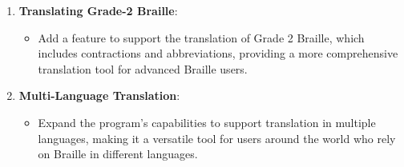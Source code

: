 \begin{enumerate}
    \item \textbf{Translating Grade-2 Braille}:
    \begin{itemize}
        \item Add a feature to support the translation of Grade 2 Braille, which includes contractions and abbreviations, providing a more comprehensive translation tool for advanced Braille users.
    \end{itemize}
    
    \item \textbf{Multi-Language Translation}:
    \begin{itemize}
        \item Expand the program's capabilities to support translation in multiple languages, making it a versatile tool for users around the world who rely on Braille in different languages.
    \end{itemize}
    
\end{enumerate}






